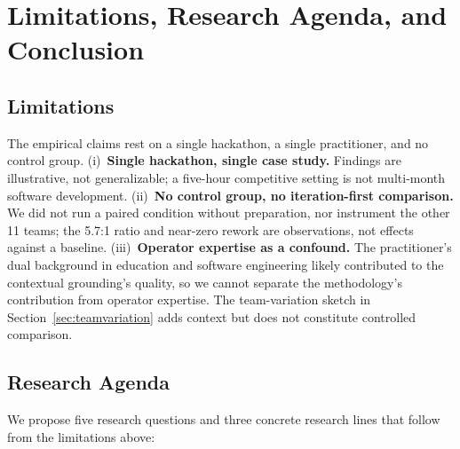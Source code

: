 \section{Limitations, Research Agenda, and Conclusion}
\label{sec:agenda}

\subsection{Limitations}
\label{sec:limitations}

The empirical claims rest on a single hackathon, a single
practitioner, and no control group. (i)~\textbf{Single hackathon,
single case study.} Findings are illustrative, not generalizable; a
five-hour competitive setting is not multi-month software
development. (ii)~\textbf{No control group, no iteration-first
comparison.} We did not run a paired condition without preparation,
nor instrument the other 11 teams; the 5.7:1 ratio and near-zero
rework are observations, not effects against a baseline.
(iii)~\textbf{Operator expertise as a confound.} The practitioner's
dual background in education and software engineering likely
contributed to the contextual grounding's quality, so we cannot
separate the methodology's contribution from operator expertise. The
team-variation sketch in Section~\ref{sec:teamvariation} adds context
but does not constitute controlled comparison.

\subsection{Research Agenda}

We propose five research questions and three concrete research
lines that follow from the limitations above:

